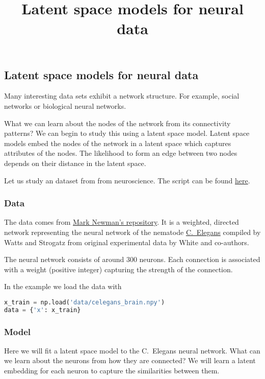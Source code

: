 \title{Latent space models for neural data}

\subsection{Latent space models for neural data}

Many interesting data sets exhibit a network structure. For example, social
networks or biological neural networks.

What we can learn about the nodes of the network from its connectivity patterns?
We can begin to study this using a latent space model.
Latent space models embed the nodes of the network in a latent space which
captures attributes of the nodes. The likelihood to form an edge between two
nodes depends on their distance in the latent space.

Let us study an dataset from from neuroscience.
The script can be found
\href{https://github.com/blei-lab/edward/blob/master/examples/tf_latent_space_model.py}{here}.

\subsubsection{Data}

The data comes from \href{http://www-personal.umich.edu/~mejn/netdata/}{Mark Newman's repository}.
It is a weighted, directed network representing the neural network of
the nematode
\href{https://en.wikipedia.org/wiki/Caenorhabditis_elegans}{C.~Elegans}
compiled by Watts and Strogatz from original experimental data
by White and co-authors.

The neural network consists of around $300$ neurons. Each connection
is associated with a weight (positive integer) capturing the strength
of the connection.

In the example we load the data with
\begin{lstlisting}[language=Python]
x_train = np.load('data/celegans_brain.npy')
data = {'x': x_train}
\end{lstlisting}

\subsubsection{Model}

Here we will fit a latent space model to the C.~Elegans neural network. What can
we learn about the neurons from how they are connected? We will learn a latent
embedding for each neuron to capture the similarities between them.

